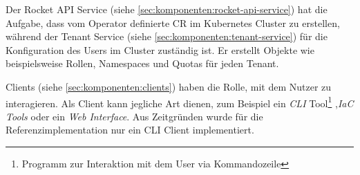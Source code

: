 Der Rocket API Service (siehe \ref{sec:komponenten:rocket-api-service}) hat die Aufgabe, 
dass vom Operator definierte \ac{CR} im Kubernetes Cluster zu erstellen,
während der Tenant Service (siehe \ref{sec:komponenten:tenant-service}) für die Konfiguration des Users im Cluster zuständig ist.
Er erstellt Objekte wie beispielsweise Rollen, Namespaces und Quotas für jeden Tenant.

Clients (siehe \ref{sec:komponenten:clients}) haben die Rolle, mit dem Nutzer zu interagieren. 
Als Client kann jegliche Art dienen, zum Beispiel ein \emph{\ac{CLI}} Tool\footnote{Programm zur Interaktion mit dem User via Kommandozeile}
,\emph{\ac{IaC} Tools} oder ein \emph{Web Interface}. Aus Zeitgründen wurde für die Referenzimplementation nur
ein \ac{CLI} Client implementiert.
